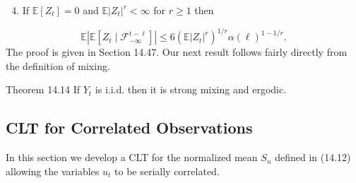 \documentclass[10pt]{article}
\begin{document}
\begin{enumerate}
  \setcounter{enumi}{3}
  \item If $\mathbb{E}\left[Z_{t}\right]=0$ and $\mathbb{E}\left|Z_{t}\right|^{r}<\infty$ for $r \geq 1$ then
\end{enumerate}
$$
\mathbb{E}\left|\mathbb{E}\left[Z_{t} \mid \mathscr{F}_{-\infty}^{t-\ell}\right]\right| \leq 6\left(\mathbb{E}\left|Z_{t}\right|^{r}\right)^{1 / r} \alpha(\ell)^{1-1 / r} .
$$
The proof is given in Section 14.47. Our next result follows fairly directly from the definition of mixing.

Theorem 14.14 If $Y_{t}$ is i.i.d. then it is strong mixing and ergodic.

\subsection{CLT for Correlated Observations}
In this section we develop a CLT for the normalized mean $S_{n}$ defined in (14.12) allowing the variables $u_{t}$ to be serially correlated.
\end{document}
